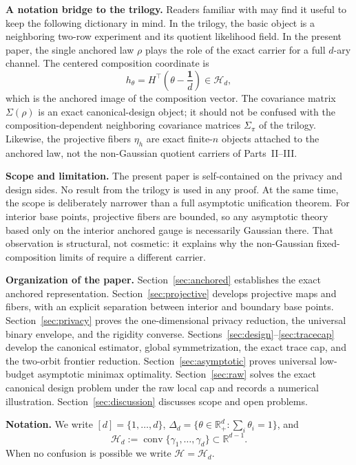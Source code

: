 \documentclass[11pt]{amsart}
\theoremstyle{definition}
\DeclareMathOperator{\conv}{conv}
\newcommand{\one}{\mathbf 1}
\newcommand{\R}{\mathbb R}
\newcommand{\cH}{\mathcal H}
\begin{document}
\medskip
\noindent\textbf{A notation bridge to the trilogy.}
Readers familiar with \cite{shvets-part1,shvets-part2,shvets-part3} may find it useful to keep the following dictionary in mind. In the trilogy, the basic object is a neighboring two-row experiment and its quotient likelihood field. In the present paper, the single anchored law $\rho$ plays the role of the exact carrier for a full $d$-ary channel. The centered composition coordinate is
\[
h_\theta=H^\top\!\left(\theta-\frac{\one}{d}\right)\in \cH_d,
\]
which is the anchored image of the composition vector. The covariance matrix $\Sigma(\rho)$ is an exact canonical-design object; it should not be confused with the composition-dependent neighboring covariance matrices $\Sigma_\pi$ of the trilogy. Likewise, the projective fibers $\eta_h$ are exact finite-$n$ objects attached to the anchored law, not the non-Gaussian quotient carriers of Parts~II--III.

\medskip
\noindent\textbf{Scope and limitation.}
The present paper is self-contained on the privacy and design sides. No result from the trilogy is used in any proof. At the same time, the scope is deliberately narrower than a full asymptotic unification theorem. For interior base points, projective fibers are bounded, so any asymptotic theory based only on the interior anchored gauge is necessarily Gaussian there. That observation is structural, not cosmetic: it explains why the non-Gaussian fixed-composition limits of \cite{shvets-part2,shvets-part3} require a different carrier.

\medskip
\noindent\textbf{Organization of the paper.}
Section~\ref{sec:anchored} establishes the exact anchored representation. Section~\ref{sec:projective} develops projective maps and fibers, with an explicit separation between interior and boundary base points. Section~\ref{sec:privacy} proves the one-dimensional privacy reduction, the universal binary envelope, and the rigidity converse. Sections~\ref{sec:design}--\ref{sec:tracecap} develop the canonical estimator, global symmetrization, the exact trace cap, and the two-orbit frontier reduction. Section~\ref{sec:asymptotic} proves universal low-budget asymptotic minimax optimality. Section~\ref{sec:raw} solves the exact canonical design problem under the raw local cap and records a numerical illustration. Section~\ref{sec:discussion} discusses scope and open problems.

\medskip
\noindent\textbf{Notation.}
We write $[d]=\{1,\dots,d\}$, $\Delta_d=\{\theta\in \R_+^d:\sum_i \theta_i=1\}$, and
\[
\cH_d:=\conv\{\gamma_1,\dots,\gamma_d\}\subset \R^{d-1}.
\]
When no confusion is possible we write $\cH=\cH_d$.
\end{document}

